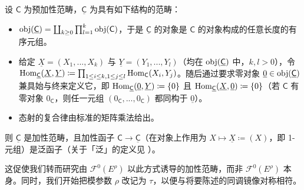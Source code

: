 \begin{Lem}\label{frompreaddtoaddcat}
	设 $\mathsf{C}$ 为预加性范畴，$\underline{\mathsf{C}}$ 为具有如下结构的范畴：
	\begin{itemize}[leftmargin=0.5cm]
		\renewcommand{\labelitemi}{\textendash}

		\item $\textup{obj}(\underline{\mathsf{C}})=\coprod_{k\geq 0}\prod_{l=1}^k\textup{obj}(\mathsf{C})$，于是 $\underline{\mathsf{C}}$ 的对象是 $\mathsf{C}$ 的对象构成的任意长度的有序元组。

		\item 给定 $\underline{X}=(X_1,...,X_k)$ 与 $\underline{Y}=(Y_1,...,Y_l)$（均在 $\textup{obj}(\underline{\mathsf{C}})$ 中，$k,l>0$），令 $\textup{Hom}_{\underline{\mathsf{C}}}(\underline{X},\underline{Y})\coloneqq\prod_{\begin{tiny}1\leq i\leq k, 1\leq j\leq l\end{tiny}}\textup{Hom}_\mathsf{C}(X_i,Y_j)$。随后通过要求零对象 $\underline{0}\in\textup{obj}(\underline{\mathsf{C}})$ 兼具始与终来定义它，即 $\textup{Hom}_{\underline{\mathsf{C}}}(\underline{0},\underline{Y})\coloneqq\{0\}$ 且 $\textup{Hom}_{\underline{\mathsf{C}}}(\underline{X},\underline{0})\coloneqq\{0\}$（若 $\mathsf{C}$ 有零对象 $0_\mathsf{C}$，则任一元组 $(0_\mathsf{C},...,0_\mathsf{C})$ 都同构于 $\underline{0}$）。

		\item 态射的复合律由标准的矩阵乘法给出。
	\end{itemize}
	则 $\underline{\mathsf{C}}$ 是加性范畴，且加性函子 $\mathsf{C}\rightarrow\underline{\mathsf{C}}$（在对象上作用为 $X\mapsto \underline{X}\coloneqq(X)$，即 1-元组）是泛函子（关于「泛」的定义见 \cite[第 III.1 节]{[Har77]}）。
\end{Lem}

这促使我们转而研究由 $\mathscr{F}^0(E^\rho)$ 以此方式诱导的加性范畴，而非 $\mathscr{F}^0(E^\rho)$ 本身。同时，我们开始把模参数 $\rho$ 改记为 $\tau$，以便与将要陈述的同调镜像对称相符。

